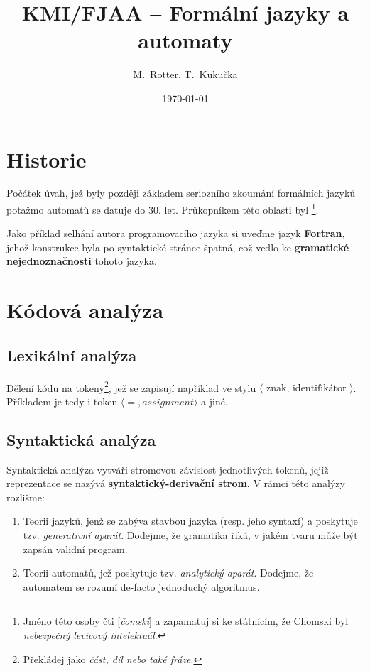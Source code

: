 \documentclass[10pt, a4paper, titlepage]{article}
\title{KMI/FJAA  -- Formální jazyky a automaty}
\author{M.~Rotter, T.~Kukučka}
\date{\today}
\theoremstyle{note}
\begin{document}
\maketitle

\section{Historie}
Počátek úvah, jež byly později základem seriozního zkoumání formálních jazyků potažmo automatů se datuje do 30. let.
Průkopníkem této oblasti byl 
\footnote{Jméno této osoby čti [\emph{čomski}] a zapamatuj si ke státnícím, že Chomski byl \emph{nebezpečný levicový intelektuál}.}.

Jako příklad selhání autora programovacího jazyka si uveďme jazyk \textbf{Fortran}, jehož konstrukce byla po syntaktické stránce špatná,
což vedlo ke \textbf{gramatické nejednoznačnosti} tohoto jazyka.

\section{Kódová analýza}
\subsection{Lexikální analýza}
Dělení kódu na tokeny\footnote{Překládej jako \emph{část, díl nebo také fráze}.}, jež se zapisují například ve stylu
$\langle\text{ znak, identifikátor }\rangle$.
Příkladem je tedy i token $\langle =, assignment \rangle$ a jiné.

\subsection{Syntaktická analýza}
Syntaktická analýza vytváři stromovou závislost jednotlivých tokenů, jejíž reprezentace se nazývá \textbf{syntaktický-derivační strom}.
V rámci této analýzy rozlišme:
\begin{enumerate}
\item
Teorii jazyků, jenž se zabýva stavbou jazyka (resp. jeho syntaxí) a poskytuje tzv. \emph{generativní aparát}.
Dodejme, že gramatika řiká, v jakém tvaru může být zapsán validní program.

\item
Teorii automatů, jež poskytuje tzv. \emph{analytický aparát}.
Dodejme, že automatem se rozumí de-facto jednoduchý algoritmus.
\end{enumerate}
\end{document}
